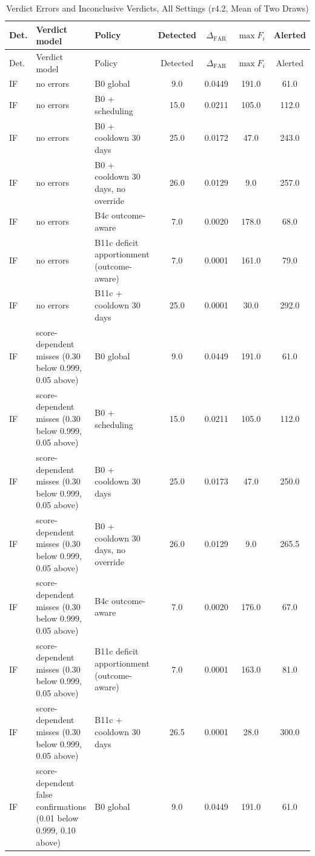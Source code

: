 \begin{longtable}{lp{5.2cm}p{4.4cm}cccc}
\caption{Verdict Errors and Inconclusive Verdicts, All Settings (r4.2, Mean of Two Draws)\label{tab:e-l4-r42}}\\
\toprule
Det. & Verdict model & Policy & Detected & $\Delta_{\mathrm{FAR}}$ & $\max F_i$ & Alerted \\
\midrule
\endfirsthead
\toprule
Det. & Verdict model & Policy & Detected & $\Delta_{\mathrm{FAR}}$ & $\max F_i$ & Alerted \\
\midrule
\endhead
IF & no errors & B0 global & 9.0 & 0.0449 & 191.0 & 61.0 \\
IF & no errors & B0 + scheduling & 15.0 & 0.0211 & 105.0 & 112.0 \\
IF & no errors & B0 + cooldown 30 days & 25.0 & 0.0172 & 47.0 & 243.0 \\
IF & no errors & B0 + cooldown 30 days, no override & 26.0 & 0.0129 & 9.0 & 257.0 \\
IF & no errors & B4c outcome-aware & 7.0 & 0.0020 & 178.0 & 68.0 \\
IF & no errors & B11c deficit apportionment (outcome-aware) & 7.0 & 0.0001 & 161.0 & 79.0 \\
IF & no errors & B11c + cooldown 30 days & 25.0 & 0.0001 & 30.0 & 292.0 \\
IF & score-dependent misses (0.30 below 0.999, 0.05 above) & B0 global & 9.0 & 0.0449 & 191.0 & 61.0 \\
IF & score-dependent misses (0.30 below 0.999, 0.05 above) & B0 + scheduling & 15.0 & 0.0211 & 105.0 & 112.0 \\
IF & score-dependent misses (0.30 below 0.999, 0.05 above) & B0 + cooldown 30 days & 25.0 & 0.0173 & 47.0 & 250.0 \\
IF & score-dependent misses (0.30 below 0.999, 0.05 above) & B0 + cooldown 30 days, no override & 26.0 & 0.0129 & 9.0 & 265.5 \\
IF & score-dependent misses (0.30 below 0.999, 0.05 above) & B4c outcome-aware & 7.0 & 0.0020 & 176.0 & 67.0 \\
IF & score-dependent misses (0.30 below 0.999, 0.05 above) & B11c deficit apportionment (outcome-aware) & 7.0 & 0.0001 & 163.0 & 81.0 \\
IF & score-dependent misses (0.30 below 0.999, 0.05 above) & B11c + cooldown 30 days & 26.5 & 0.0001 & 28.0 & 300.0 \\
IF & score-dependent false confirmations (0.01 below 0.999, 0.10 above) & B0 global & 9.0 & 0.0449 & 191.0 & 61.0 \\

\end{longtable}
